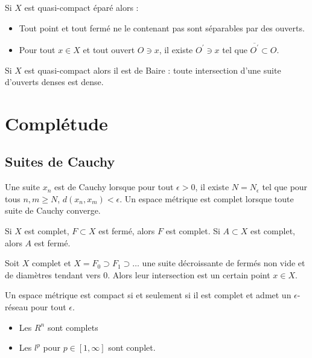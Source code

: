 \documentclass{cours}
\begin{document}
\begin{lemma}
    Si $X$ est quasi-compact éparé alors :
    \begin{itemize}
        \item Tout point et tout fermé ne le contenant pas sont séparables par des ouverts.
        \item Pour tout $x \in X$ et tout ouvert $O \owns x$, il existe $O^{'} \owns x$ tel que $\overline{O^{'}} \subset O$.
    \end{itemize}
\end{lemma}

\begin{theorem}\label{thm:Bairemétrique}
    Si $X$ est quasi-compact alors il est de Baire : toute intersection d'une suite d'ouverts denses est dense.
\end{theorem}

\section{Complétude}
\subsection{Suites de Cauchy}
\begin{definition}
    Une suite $x_{n}$ est de Cauchy lorsque pour tout $\epsilon > 0$, il existe $N = N_{\epsilon}$ tel que pour tous $n, m \geq N$, $d(x_{n}, x_{m}) < \epsilon$. Un espace métrique est complet lorsque toute suite de Cauchy converge.
\end{definition}

\begin{lemma}
    Si $X$ est complet, $F \subset X$ est fermé, alors $F$ est complet. Si $A \subset X$ est complet, alors $A$ est fermé.
\end{lemma}

\begin{lemma}
    Soit $X$ complet et $X = F_{0} \supset F_{1} \supset \dots$ une suite décroissante de fermés non vide et de diamètres tendant vers $0$. Alors leur intersection est un certain point $x \in X$.
\end{lemma}

\begin{theorem}
    Un espace métrique est compact si et seulement si il est complet et admet un $\epsilon$-réseau pour tout $\epsilon$.
\end{theorem}

\begin{theorem}
    \begin{itemize}
        \item Les $R^{n}$ sont complets
        \item Les $l^{p}$ pour $p \in \left[1, \infty\right]$ sont conplet.
    \end{itemize}
\end{theorem}
\end{document}
